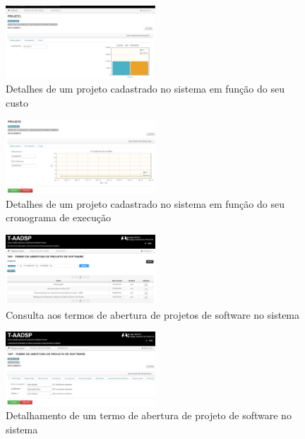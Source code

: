 \documentclass{acm_proc_article-sp}
\begin{document}
\begin{appendices}
\begin{figure}[h]
\centering %
\includegraphics[width=0.5\textwidth]{RF_detalhamento_Projeto.jpg} %
\caption{Detalhes de um projeto cadastrado no sistema em função do seu custo}
\end{figure}

\begin{figure}[h]
\centering %
\includegraphics[width=0.5\textwidth]{RF_detalhamento_Projeto_Cronograma.jpg} %
\caption{Detalhes de um projeto cadastrado no sistema em função do seu cronograma de execução}
\end{figure}

\begin{figure}[h]
\centering %
\includegraphics[width=0.5\textwidth]{RF_TAPConsulta.jpg} %
\caption{Consulta aos termos de abertura de projetos de software no sistema}
\end{figure}

\begin{figure}[h]
\centering %
\includegraphics[width=0.5\textwidth]{RF_TAPDetalhamento.jpg} %
\caption{Detalhamento de um termo de abertura de projeto de software no sistema}
\end{figure}


\end{appendices}
\end{document}
